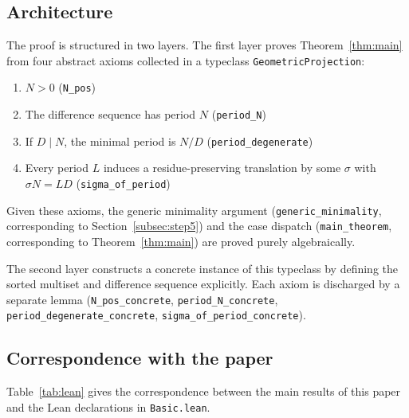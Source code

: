 \documentclass[11pt]{article}
\theoremstyle{plain}
\theoremstyle{definition}
\theoremstyle{remark}
\begin{document}
\subsection{Architecture}\label{subsec:lean_arch}

The proof is structured in two layers.  The first layer proves
Theorem~\ref{thm:main} from four abstract axioms collected in a
typeclass \texttt{GeometricProjection}:
\begin{enumerate}
    \item $N > 0$ \hfill (\texttt{N\_pos})
    \item The difference sequence has period $N$
          \hfill (\texttt{period\_N})
    \item If $D \mid N$, the minimal period is $N/D$
          \hfill (\texttt{period\_degenerate})
    \item Every period $L$ induces a residue-preserving translation
          by some $\sigma$ with $\sigma N = LD$
          \hfill (\texttt{sigma\_of\_period})
\end{enumerate}
Given these axioms, the generic minimality argument
(\texttt{generic\_minimality}, corresponding to
Section~\ref{subsec:step5}) and the case dispatch
(\texttt{main\_theorem}, corresponding to Theorem~\ref{thm:main})
are proved purely algebraically.

The second layer constructs a concrete instance of this typeclass
by defining the sorted multiset and difference sequence explicitly.
Each axiom is discharged by a separate lemma
(\texttt{N\_pos\_concrete}, \texttt{period\_N\_concrete},
\texttt{period\_degenerate\_concrete},
\texttt{sigma\_of\_period\_concrete}).

\subsection{Correspondence with the paper}\label{subsec:lean_corr}

Table~\ref{tab:lean} gives the correspondence between the main
results of this paper and the Lean declarations in
\texttt{Basic.lean}.
\end{document}

